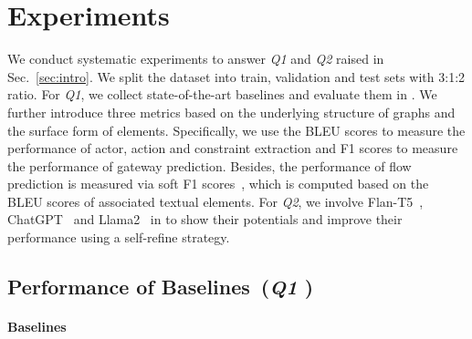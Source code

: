 

\section{Experiments
}

We conduct systematic experiments to answer \textit{Q1} and \textit{Q2} raised in Sec.~\ref{sec:intro}. We split the dataset into train, validation and test sets with 3:1:2 ratio. For \textit{Q1}, we collect state-of-the-art baselines and evaluate them in \benchmark. We further introduce three metrics based on the underlying structure of graphs and the surface form of elements. Specifically, we use the BLEU scores to measure the performance of actor, action and constraint extraction and F1 scores to measure the performance of gateway prediction. Besides, the performance of flow prediction is measured via soft F1 scores~\cite{tandon-etal-2020-dataset}, which is computed based on the BLEU scores of associated textual elements. For \textit{Q2}, we involve Flan-T5~\cite{chung2022scaling}, ChatGPT~\cite{ouyang2022training} and Llama2~\cite{touvron2023llama} in \benchmark to show their potentials and improve their performance using a self-refine strategy.


\subsection{Performance of Baselines~(\textit{Q1
}
)}

\paragraph{Baselines}

